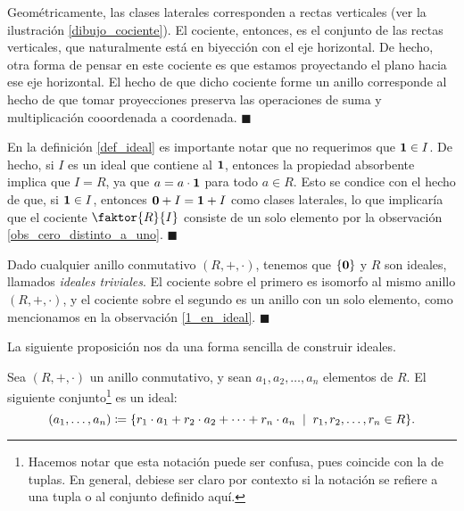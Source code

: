 \begin{example}
Geométricamente, las clases laterales corresponden a rectas verticales (ver la ilustración \ref{dibujo_cociente}). El cociente, entonces, es el conjunto de las rectas verticales, que naturalmente está en biyección con el eje horizontal. De hecho, otra forma de pensar en este cociente es que estamos proyectando el plano hacia ese eje horizontal. El hecho de que dicho cociente forme un anillo corresponde al hecho de que tomar proyecciones preserva las operaciones de suma y multiplicación cooordenada a coordenada.
\hfill$\blacksquare$
\end{example}

\begin{remark} \label{1_en_ideal}
En la definición \ref{def_ideal} es importante notar que no requerimos que $\mathbf{1} \in I$. De hecho, si $I$ es un ideal que contiene al $\mathbf{1}$, entonces la propiedad absorbente implica que $I = R$, ya que $a = a \cdot \mathbf{1}$ para todo $a \in R$. Esto se condice con el hecho de que, si $\mathbf{1} \in I$, entonces $\mathbf{0} + I = \mathbf{1} + I$ como clases laterales, lo que implicaría que el cociente $\faktor{R}{I}$ consiste de un solo elemento por la observación \ref{obs_cero_distinto_a_uno}.
\hfill$\blacksquare$
\end{remark}

\begin{example}
Dado cualquier anillo conmutativo $(R, +, \cdot)$, tenemos que $\{\mathbf{0}\}$ y $R$ son ideales, llamados \emph{ideales triviales}. El cociente sobre el primero es isomorfo al mismo anillo $(R, +, \cdot)$, y el cociente sobre el segundo es un anillo con un solo elemento, como mencionamos en la observación \ref{1_en_ideal}.
\hfill$\blacksquare$
\end{example}

La siguiente proposición nos da una forma sencilla de construir ideales.

\begin{prop} \label{ideal_generado}
Sea $(R, +, \cdot)$ un anillo conmutativo, y sean $a_1, a_2, \dots, a_n$ elementos de $R$. El siguiente conjunto\footnote{Hacemos notar que esta notación puede ser confusa, pues coincide con la de tuplas. En general, debiese ser claro por contexto si la notación se refiere a una tupla o al conjunto definido aquí.} es un ideal: $$\left( a_1, \dots, a_n \right) \coloneqq \{r_1 \cdot a_1 + r_2 \cdot a_2 + \cdots + r_n \cdot a_n \; \mid \; r_1, r_2, \dots, r_n \in R\}.$$
\end{prop}

